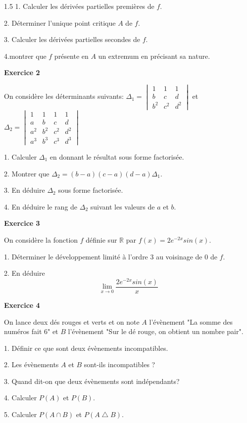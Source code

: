 \documentclass[12pt]{article}
\begin{document}
\begin{spacing}{1.5}
 1. Calculer les dérivées partielles premières de $f$.
 
 2. Déterminer l'unique point critique $A$ de $f$.
 
 3. Calculer les dérivées partielles secondes de $f$.
 
 4.montrer que $f$ présente en $A$ un extremum en précisant sa nature.
 
 \textbf{Exercice 2}
 
  On considère les déterminants suivants:
 $\Delta_1= \begin{vmatrix}
 1 & 1 & 1\\
 b & c & d\\
 b^2 & c^2 & d^2
 \end{vmatrix}$
 et $\Delta_2=\begin{vmatrix}
 1 & 1 & 1 & 1 \\
 a & b & c & d \\
 a^2 & b^2 & c^2 & d^2 \\
 a^3 & b^3 & c^3 & d^3
\end{vmatrix} $
 
 
 1. Calculer $\Delta_1$ en donnant le résultat sous forme factorisée.
 
 2. Montrer que $\Delta_2 =(b-a)(c-a)(d-a)\Delta_1$.
 
 3. En déduire $\Delta_2$ sous forme factorisée.
 
 4. En déduire le rang de $\Delta_2$ suivant les valeurs de $a$ et $b$.
 
 \medskip\textbf{Exercice 3 }
 
 On considère la fonction $f$ définie sur $\mathbb{R}$ par $f(x) = 2e^{-2x}sin(x)$.
 
 1. Déterminer le développement limité à l'ordre 3 au voisinage de 0 de $f$.
 
 2. En déduire
 \[
 \lim_{x\longrightarrow 0}\frac{2e^{-2x}sin(x)}{x}
 \]

 \textbf{Exercice 4 }
 
 On lance deux dés rouges et verts et on note $A$ l'évènement "La somme des numéros fait 6" et
 $B$ l'évènement "Sur le dé rouge, on obtient un nombre pair".
 
 1. Définir ce que sont deux évènements incompatibles.

 2. Les évènements $A$ et $B$ sont-ils incompatibles ?
 
 3. Quand dit-on que deux évènements sont indépendants?
 
 4. Calculer $P(A)$ et $P(B)$.
 
 5. Calculer $P(A\cap B)$ et $P(A\bigtriangleup B)$.
 

\end{spacing}
\end{document}
